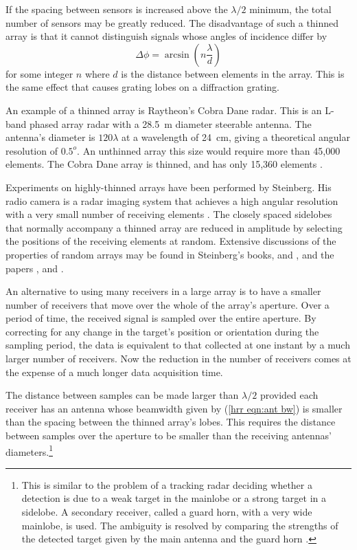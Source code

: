 If the spacing between sensors is increased above the $\lambda/2$
minimum, the total number of sensors may be greatly reduced.  The
disadvantage of such a thinned array is that it cannot distinguish signals
whose angles of incidence differ by 
\begin{equation}
\Delta\phi=\arcsin\left(n\frac{\lambda}{d}\right)
\end{equation}
for some integer $n$ where $d$ is the distance between elements in the
array.  This is the same effect that causes grating lobes on a diffraction
grating.

An example of a thinned array is Raytheon's Cobra Dane radar. This is an
L-band phased array radar with a 28.5~m diameter steerable antenna.  The
antenna's diameter is $120\lambda$ at a wavelength of 24~cm, giving a
theoretical angular resolution of $0.5^o$.  An unthinned array this size
would require more than 45,000 elements.  The Cobra Dane array is thinned, and has
only 15,360 elements \cite{Sko90}.

Experiments on highly-thinned arrays have been performed by Steinberg.  His
radio camera is a radar imaging system that achieves a high angular
resolution with a very small number of receiving elements \cite{Ste81,Ste83}.
The closely spaced sidelobes that normally accompany a thinned array are
reduced in amplitude by selecting the positions of the receiving elements at
random. Extensive discussions of the properties of random arrays may be
found in Steinberg's books, \cite{Ste76} and \cite{Ste83b}, and the papers
\cite{Att89}, \cite{Ste81} and \cite{Tah76}.

An alternative to using many receivers in a large array is to have a smaller
number of receivers that move over the whole of the array's aperture.  Over
a period of time, the received signal is sampled over the entire aperture. 
By correcting for any change in the target's position or orientation during
the sampling period, the data is equivalent to that collected at one instant
by a much larger number of receivers.  Now the reduction in the number of
receivers comes at the expense of a much longer data acquisition time.

The distance between samples can be made larger than $\lambda/2$ provided
each receiver has an antenna whose beamwidth given by (\ref{hrr eqn:ant bw})
is smaller than the spacing between the thinned array's lobes.  This
requires the distance between samples over the aperture to be smaller than
the receiving antennas' diameters.\footnote{This is similar to the problem
of a tracking radar deciding whether a detection is due to a weak target
in the mainlobe or a strong target in a sidelobe.  A secondary receiver,
called a guard horn, with a very wide mainlobe, is used.  The ambiguity is
resolved by comparing the strengths of the detected target given 
by the main antenna and the guard horn \protect\cite{Sti83}.}


